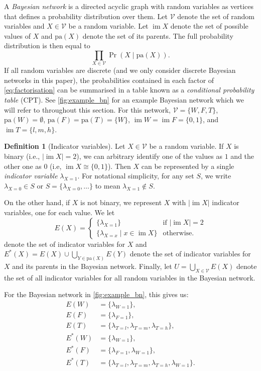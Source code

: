 \documentclass{article}
\theoremstyle{definition}
\newtheorem{definition}{Definition}
\theoremstyle{remark}
\DeclareMathOperator{\im}{im}
\begin{document}
A \emph{Bayesian network} is a directed acyclic graph with random variables as
vertices that defines a probability distribution over them. Let $\mathcal{V}$
denote the set of random variables and $X \in \mathcal{V}$ be a random variable.
Let $\im X$ denote the set of possible values of $X$ and $\mathrm{pa}(X)$ denote
the set of its parents. The full probability distribution is then equal to
\begin{equation} \label{eq:factorisation}
  \prod_{X \in \mathcal{V}} \Pr(X \mid \mathrm{pa}(X)).
\end{equation}
If all random variables are discrete (and we only consider discrete Bayesian
networks in this paper), the probabilities contained in each factor of
\cref{eq:factorisation} can be summarised in a table known as a
\emph{conditional probability table} (CPT). See \cref{fig:example_bn} for an
example Bayesian network which we will refer to throughout this section. For
this network, $\mathcal{V} = \{ W, F, T \}$, $\mathrm{pa}(W) = \emptyset$,
$\mathrm{pa}(F) = \mathrm{pa}(T) = \{ W \}$, $\im W = \im F = \{0, 1 \}$, and
$\im T = \{ l, m, h \}$.

\begin{definition}[Indicator variables]
  Let $X \in \mathcal{V}$ be a random variable. If $X$ is binary (i.e., $|\im X|
  = 2$), we can arbitrary identify one of the values as $1$ and the other one as
  $0$ (i.e, $\im X \cong \{ 0, 1 \}$). Then $X$ can be represented by a single
  \emph{indicator variable} $\lambda_{X=1}$. For notational simplicity, for any
  set $S$, we write $\lambda_{X=0} \in S$ or $S = \{ \lambda_{X=0}, \dots \}$ to
  mean $\lambda_{X=1} \not\in S$.

  On the other hand, if $X$ is not binary, we represent $X$ with $|\im X|$
  indicator variables, one for each value. We let
  \[
    E(X) = \begin{cases}
      \{ \lambda_{X=1} \} & \text{if } |\im X| = 2 \\
      \{ \lambda_{X=x} \mid x \in \im X \} & \text{otherwise.}
    \end{cases}
  \]
  denote the set of indicator variables for $X$ and $E^*(X) = E(X) \cup
  \bigcup_{Y \in \mathrm{pa}(X)} E(Y)$ denote the set of indicator variables for
  $X$ and its parents in the Bayesian network. Finally, let $U = \bigcup_{X \in
    \mathcal{V}} E(X)$ denote the set of all indicator variables for all random
  variables in the Bayesian network.
\end{definition}

For the Bayesian network in \cref{fig:example_bn}, this gives us:
\begin{align*}
  E(W) &= \{ \lambda_{W=1} \}, \\
  E(F) &= \{ \lambda_{F=1} \}, \\
  E(T) &= \{ \lambda_{T=l}, \lambda_{T=m}, \lambda_{T=h} \}, \\
  E^*(W) &= \{ \lambda_{W=1} \}, \\
  E^*(F) &= \{ \lambda_{F=1}, \lambda_{W=1} \}, \\
  E^*(T) &= \{ \lambda_{T=l}, \lambda_{T=m}, \lambda_{T=h}, \lambda_{W=1} \}.
\end{align*}
\end{document}
